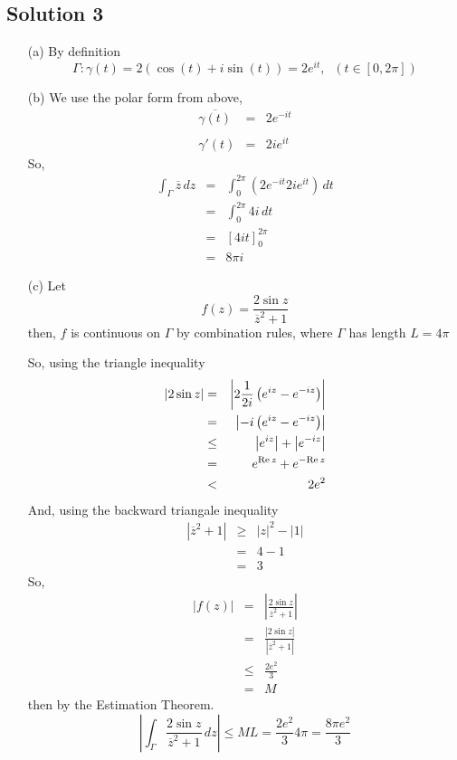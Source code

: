 \subsection*{Solution 3}

\begin{itemize}
\item[(a)]
By definition 
\[ \Gamma: \gamma(t) = 2(\cos(t) + i\sin(t)) = 2e^{it},\;\; (t\in[0,2\pi]) \]

\item[(b)]
We use the polar form from above,
\begin{eqnarray*}
\overline{\gamma(t)}
	&=& 2e^{-it}\\
\\
\gamma'(t)
	&=& 2ie^{it}
\end{eqnarray*}
So,
\begin{eqnarray*}
\int_\Gamma \overline{z}\,dz
	&=& \int_0^{2\pi} \left( 2e^{-it} 2ie^{it} \right) \, dt \\
	&=& \int_0^{2\pi} 4i\,dt \\
	&=& \left[ 4it \right]_0^{2\pi} \\
	&=& 8\pi i
\end{eqnarray*}

\item[(c)]
Let
\[ f(z) = \frac{ 2\sin z }{ \overline{z}^2+1 } \]
then, $f$ is continuous on $\Gamma$ by combination rules, where $\Gamma$
has length $L=4\pi$


So, using the triangle inequality
\begin{eqnarray*}
|2\sin z|
	&=& \left| 2\frac{1}{2i} \left( e^{iz} - e^{-iz} \right) \right| \\
	&=& \left| -i \left( e^{iz} - e^{-iz} \right) \right| \\
	&\le& \left| e^{iz} \right| + \left| e^{-iz} \right| \\
	&=& e^{{\rm Re}\,z} + e^{-{\rm Re}\,z} \\
	&<& 2e^2
\end{eqnarray*}
And, using the backward triangale inequality
\begin{eqnarray*}
\left| \overline{z}^2+1 \right|
	&\ge& \left| z \right|^2 - |1| \\
	&=& 4-1 \\
	&=& 3
\end{eqnarray*}
So,
\begin{eqnarray*}
|f(z)|	&=& \left| \frac{ 2\sin z }{ \overline{z}^2+1 } \right| \\
	&=& \frac{ |2\sin z| }{ \left| \overline{z}^2+1 \right| } \\
	&\le& \frac{2e^2}{3} \\
	&=& M
\end{eqnarray*}
then by the Estimation Theorem.
\[
\left| \int_\Gamma \frac{ 2\sin z }{ \overline{z}^2+1 }\,dz \right|
\le ML = \frac{2e^2}{3} 4\pi = \frac{8\pi e^2}{3} 
\]

\end{itemize}

